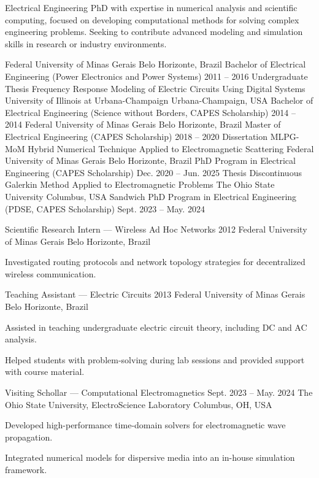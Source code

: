 \documentclass{cv}
\begin{document}
\makeprofileheader

\begin{Objective}
    Electrical Engineering PhD with expertise in numerical analysis and scientific computing, focused on developing computational methods for solving complex engineering problems. Seeking to contribute advanced modeling and simulation skills in research or industry environments.
\end{Objective}

\begin{Education}
    \educationitem
    {Federal University of Minas Gerais}
    {Belo Horizonte, Brazil}
    {Bachelor of Electrical Engineering (Power Electronics and Power Systems)}
    {2011 -- 2016}
    {Undergraduate Thesis}
    {Frequency Response Modeling of Electric Circuits Using Digital Systems}
    \educationitem
    {University of Illinois at Urbana-Champaign}
    {Urbana-Champaign, USA}
    {Bachelor of Electrical Engineering (Science without Borders,
    CAPES Scholarship)}
    {2014 -- 2014}
    {}
    {}
    \educationitem
    {Federal University of Minas Gerais}
    {Belo Horizonte, Brazil}
    {Master of Electrical Engineering (CAPES Scholarship)}
    {2018 -- 2020}
    {Dissertation}
    {MLPG-MoM Hybrid Numerical Technique Applied to Electromagnetic Scattering}
    \educationitem
    {Federal University of Minas Gerais}
    {Belo Horizonte, Brazil}
    {PhD Program in Electrical Engineering (CAPES Scholarship)}
    {Dec. 2020 -- Jun. 2025}
    {Thesis}
    {Discontinuous Galerkin Method Applied to Electromagnetic Problems}
    \educationitem
    {The Ohio State University}
    {Columbus, USA}
    {Sandwich PhD Program in Electrical Engineering (PDSE, CAPES Scholarship)}
    {Sept. 2023 -- May. 2024}
    {}
    {}
\end{Education}

\begin{Experience}
\experienceitem
  {Scientific Research Intern — Wireless Ad Hoc Networks}
  {2012}
  {Federal University of Minas Gerais}
  {Belo Horizonte, Brazil}
  {
    \item Investigated routing protocols and network topology strategies for decentralized wireless communication.
  }

\experienceitem
  {Teaching Assistant — Electric Circuits}
  {2013}
  {Federal University of Minas Gerais}
  {Belo Horizonte, Brazil}
  {
    \item Assisted in teaching undergraduate electric circuit theory, including DC and AC analysis.
    \item Helped students with problem-solving during lab sessions and provided support with course material.
  }

\experienceitem
  {Visiting Schollar — Computational Electromagnetics}
  {Sept. 2023 -- May. 2024}
  {The Ohio State University, ElectroScience Laboratory}
  {Columbus, OH, USA}
  {
    \item Developed high-performance time-domain solvers for electromagnetic wave propagation.
    \item Integrated numerical models for dispersive media into an in-house simulation framework.
  }
\end{Experience}
\end{document}
